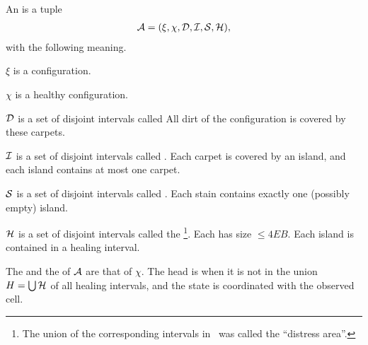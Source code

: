 \documentclass[12pt]{memoir}
\renewcommand{\le}{\leq}
\def\B{B}
\newcommand{\E}{E}
\renewcommand{\H}{H}
\begin{document}
\begin{definition}\label{def:annotation-struct}
  An  is a tuple
  \begin{align*}
    \mathcal{A}=(\xi,\chi, \mathcal{D}, \mathcal{I}, \mathcal{S}, \mathcal{H}),
  \end{align*}
  with the following meaning.

  \( \xi \) is a configuration.

  \( \chi \) is a healthy configuration.

  \( \mathcal{D} \) is a set of disjoint intervals called 
  All dirt of the configuration is covered by these carpets.

  \( \mathcal{I} \) is a set of disjoint intervals called .
Each carpet is covered by an island, and each island contains at most one carpet.

  \( \mathcal{S} \) is a set of disjoint intervals called .
  Each stain contains exactly one (possibly empty) island.

 \( \mathcal{H} \) is a set of disjoint
intervals called the \footnote{The union
   of the corresponding intervals in~\cite{burstyTuring13} was called the ``distress area''.}.
 Each has size \( \le 4\E\B \). %
Each island is contained in a healing interval.

The  and the  of \( \mathcal{A} \) are that 
of \( \chi \).
The head is  when it is not in the union \( \H=\bigcup\cH \) of all healing intervals,
and the state is coordinated with the observed cell.
  \end{definition}
\end{document}
